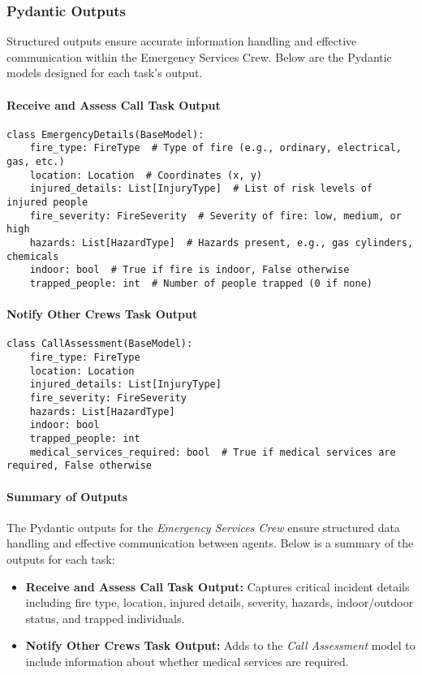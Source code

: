 \subsubsection{Pydantic Outputs}
Structured outputs ensure accurate information handling and effective communication within the Emergency Services Crew. Below 
are the Pydantic models designed for each task's output.

\paragraph{Receive and Assess Call Task Output}
\begin{lstlisting}[caption={Pydantic model for Receive and Assess Call Task Output}] 
class EmergencyDetails(BaseModel):
    fire_type: FireType  # Type of fire (e.g., ordinary, electrical, gas, etc.)
    location: Location  # Coordinates (x, y)
    injured_details: List[InjuryType]  # List of risk levels of injured people
    fire_severity: FireSeverity  # Severity of fire: low, medium, or high
    hazards: List[HazardType]  # Hazards present, e.g., gas cylinders, chemicals
    indoor: bool  # True if fire is indoor, False otherwise
    trapped_people: int  # Number of people trapped (0 if none)
\end{lstlisting}

\paragraph{Notify Other Crews Task Output}
\begin{lstlisting}[caption={Pydantic model for Notify Other Crews Task Output}] 
class CallAssessment(BaseModel):
    fire_type: FireType
    location: Location
    injured_details: List[InjuryType]
    fire_severity: FireSeverity
    hazards: List[HazardType]
    indoor: bool
    trapped_people: int
    medical_services_required: bool  # True if medical services are required, False otherwise
\end{lstlisting}

\paragraph{Summary of Outputs}
The Pydantic outputs for the \textit{Emergency Services Crew} ensure structured data handling and effective communication between agents. Below is a summary of the outputs for each task:

\begin{itemize}
    \item \textbf{Receive and Assess Call Task Output:} Captures critical incident details including fire type, location, injured details, severity, hazards, indoor/outdoor status, and trapped individuals.
    \item \textbf{Notify Other Crews Task Output:} Adds to the \textit{Call Assessment} model to include information about 
    whether medical services are required.
\end{itemize} 